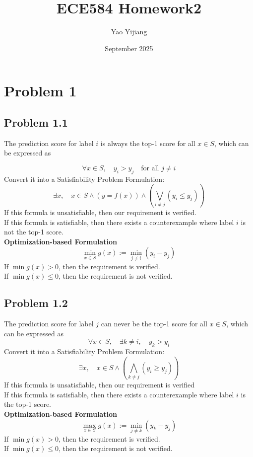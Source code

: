 \documentclass{article}
\title{ECE584 Homework2}
\author{Yao Yijiang}
\date{September 2025}
\begin{document}
\maketitle

\section{Problem 1}
\subsection{Problem 1.1}
The prediction score for label $i$ is always the top-1 score for all $x  \in S$, which can be expressed as


\begin{equation}
    \forall x \in S,\quad y_i > y_j \quad \text{for all } j \neq i
\end{equation}
Convert it into a Satisfiability Problem Formulation:
\begin{equation}
    \exists x, \quad x \in S \land (y = f(x)) \land \left(\bigvee_{i\neq j} (y_i \leq y_j)\right)
\end{equation}
If this formula is unsatisfiable, then our requirement is verified.\\
If this formula is satisfiable, then there exists a counterexample where label $i$ is not the top-1 score.\\
\textbf{Optimization-based Formulation}
\begin{equation}
    \min_{x \in S} g(x) := \min_{j \neq i} (y_i - y_j)
\end{equation}
If $\min g(x) > 0$, then the requirement is verified.\\
If $\min g(x) \leq 0$, then the requirement is not verified.

\subsection{Problem 1.2}
The prediction score for label $j$ can never be the top-1 score for all $x \in S$, which can be expressed as
\begin{equation}
    \forall x \in S, \quad \exists k \neq i, \quad y_k > y_i
\end{equation}
Convert it into a Satisfiability Problem Formulation:
\begin{equation}
    \exists x, \quad x \in S \land \left(\bigwedge_{k\neq j} (y_i \geq y_j)\right)
\end{equation}
If this formula is unsatisfiable, then our requirement is verified\\
If this formula is satisfiable, then there exists a counterexample where label $i$ is the top-1 score.\\
\textbf{Optimization-based Formulation}
\begin{equation}
    \max_{x \in S} g(x) := \min_{j \neq k} (y_k - y_j)
\end{equation}
If $\min g(x) > 0$, then the requirement is verified.\\
If $\min g(x) \leq 0$, then the requirement is not verified.
\end{document}
